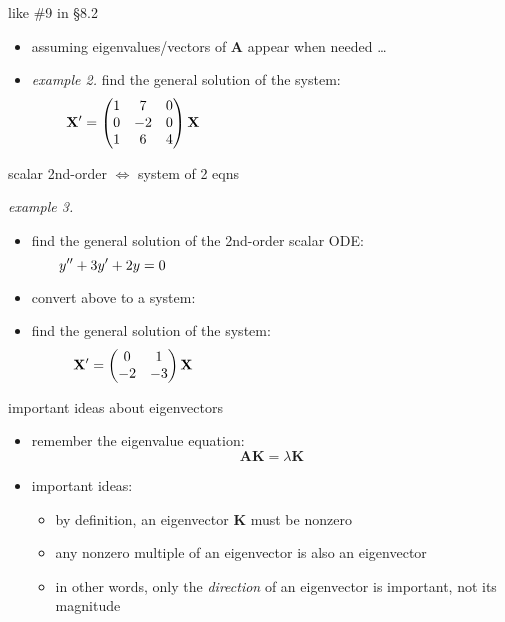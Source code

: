 \documentclass[urlcolor=blue,dvipsnames]{beamer}
\newcommand{\bA}{\mathbf{A}}
\newcommand{\bK}{\mathbf{K}}
\newcommand{\bX}{\mathbf{X}}
\begin{document}
\begin{frame}{like \#9 in \S8.2}

\begin{itemize}
\item assuming eigenvalues/vectors of $\bA$ appear when needed \dots
\item \emph{example 2.}  find the general solution of the system:
$$\bX' = \begin{pmatrix} 1 & 7 & 0 \\ 0 & -2 & 0 \\ 1 & 6 & 4 \end{pmatrix} \bX \hspace{70mm}$$
\end{itemize}

\vspace{50mm}
\end{frame}


\begin{frame}{scalar 2nd-order $\iff$ system of 2 eqns}

\noindent \emph{example 3.}
\begin{itemize}
\item find the general solution of the 2nd-order scalar ODE:
$$y''+3y'+2y=0 \hspace{80mm}$$

\vspace{7mm}
\item convert above to a system:

\vspace{10mm}
\item find the general solution of the system:
$$\bX' = \begin{pmatrix} 0 & 1 \\ -2 & -3 \end{pmatrix} \bX \hspace{70mm}$$

\vspace{12mm}
\end{itemize}
\end{frame}


\begin{frame}{important ideas about eigenvectors}

\begin{itemize}
\medskip
\item remember the eigenvalue equation:
   $$\bA \bK = \lambda \bK$$
\item important ideas:
    \begin{itemize}
    \item by definition, \alert{an eigenvector $\bK$ must be nonzero}
    \item \alert{any nonzero multiple of an eigenvector is also an eigenvector}
    \item in other words, only the \emph{direction} of an eigenvector is important, not its magnitude
    \end{itemize}
\end{itemize}
\end{frame}
\end{document}
